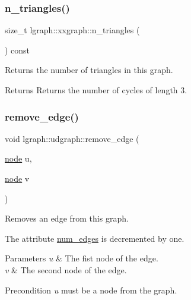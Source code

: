 \subsubsection{\texorpdfstring{n\+\_\+triangles()}{n\_triangles()}}
{\footnotesize\ttfamily size\+\_\+t lgraph\+::xxgraph\+::n\+\_\+triangles (\begin{DoxyParamCaption}{ }\end{DoxyParamCaption}) const\hspace{0.3cm}{\ttfamily [inherited]}}



Returns the number of triangles in this graph. 

\begin{DoxyReturn}{Returns}
Returns the number of cycles of length 3. 
\end{DoxyReturn}
\mbox{\label{classlgraph_1_1udgraph_af1225a134bea314254c03e18a18a41d2}} 
\subsubsection{\texorpdfstring{remove\+\_\+edge()}{remove\_edge()}\hspace{0.1cm}{\footnotesize\ttfamily [1/2]}}
{\footnotesize\ttfamily void lgraph\+::udgraph\+::remove\+\_\+edge (\begin{DoxyParamCaption}\item[{\hyperlink{namespacelgraph_a397169dd66adf725210a30fb7251773e}{node}}]{u,  }\item[{\hyperlink{namespacelgraph_a397169dd66adf725210a30fb7251773e}{node}}]{v }\end{DoxyParamCaption})\hspace{0.3cm}{\ttfamily [virtual]}}



Removes an edge from this graph. 

The attribute \hyperlink{classlgraph_1_1xxgraph_a6765a9a3be42f6e0f824635c593b35d7}{num\+\_\+edges} is decremented by one. 
\begin{DoxyParams}{Parameters}
{\em u} & The fist node of the edge. \\
\hline
{\em v} & The second node of the edge. \\
\hline
\end{DoxyParams}
\begin{DoxyPrecond}{Precondition}
{\itshape u} must be a node from the graph. 
\end{DoxyPrecond}


